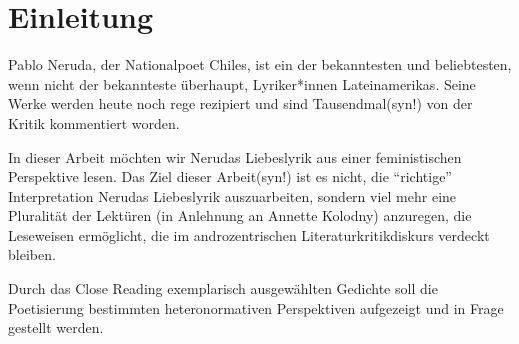 \section{Einleitung}

Pablo Neruda, der Nationalpoet Chiles, ist ein der bekanntesten und beliebtesten, wenn nicht der bekannteste überhaupt, Lyriker*innen Lateinamerikas.
Seine Werke werden heute noch rege rezipiert und sind Tausendmal(syn!) von der Kritik kommentiert worden.


In dieser Arbeit möchten wir Nerudas Liebeslyrik aus einer feministischen Perspektive lesen.
Das Ziel dieser Arbeit(syn!) ist es nicht, die ``richtige'' Interpretation Nerudas Liebeslyrik auszuarbeiten, sondern viel mehr eine Pluralität der Lektüren (in Anlehnung an Annette Kolodny) anzuregen, die Leseweisen ermöglicht, die im androzentrischen Literaturkritikdiskurs verdeckt bleiben.


Durch das Close Reading exemplarisch ausgewählten Gedichte soll die Poetisierung bestimmten heteronormativen Perspektiven aufgezeigt und in Frage gestellt werden.


\begin{comment}
1. Intro
  * Ziel von Feministischen Lektüren: zugrunde liegende Machtstrukturen in Werken und deren Rezeption aufzudecken
    ** androzentrische Perspektive der Literatur:
       *** Männer in Mittelpunkt (als Figuren)
       *** von Männern gemacht
       *** an Männer gerichtet
  * Wie erreicht? Durch eine Pluralität der Lektüren und Close Reading
ohne das ouevre Nerudas nicht als ganzes in Frage stellen
exemplarische Lektüren: Poetisierung bestimmter Heteronormativen Perspektiven
gehört historisiert; nicht als zeitlos darzustellen
\end{comment}
